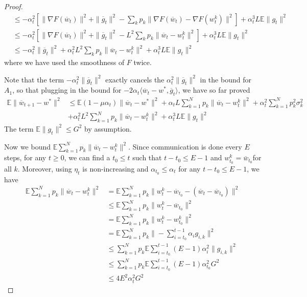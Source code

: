 \begin{proof}
\begin{align*}
 & \leq-\alpha_{t}^{2}\left[\|\nabla F(\overline{w}_{t})\|^{2}+\|\overline{g}_{t}\|^{2}-\sum_{k}p_{k}\|\nabla F(\overline{w}_{t})-\nabla F(w_{t}^{k})\|^{2}\right]+\alpha_{t}^{3}L\mathbb{E}\|g_{t}\|^{2}\\
 & \leq-\alpha_{t}^{2}\left[\|\nabla F(\overline{w}_{t})\|^{2}+\|\overline{g}_{t}\|^{2}-L^{2}\sum_{k}p_{k}\|\overline{w}_{t}-w_{t}^{k}\|^{2}\right]+\alpha_{t}^{3}L\mathbb{E}\|g_{t}\|^{2}\\
 & \leq-\alpha_{t}^{2}\|\overline{g}_{t}\|^{2}+\alpha_{t}^{2}L^{2}\sum_{k}p_{k}\|\overline{w}_{t}-w_{t}^{k}\|^{2}+\alpha_{t}^{3}L\mathbb{E}\|g_{t}\|^{2}
\end{align*}
where we have used the smoothness of $F$ twice. 

Note that the term $-\alpha_{t}^{2}\|\overline{g}_{t}\|^{2}$ exactly
cancels the $\alpha_{t}^{2}\|\overline{g}_{t}\|^{2}$ in the bound
for $A_{1}$, so that plugging in the bound for $-2\alpha_{t}\langle\overline{w}_{t}-w^{\ast},\overline{g}_{t}\rangle$,
we have so far proved 
\begin{align*}
\mathbb{E}\|\overline{w}_{t+1}-w^{\ast}\|^{2} & \leq\mathbb{E}(1-\mu\alpha_{t})\|\overline{w}_{t}-w^{\ast}\|^{2}+\alpha_{t}L\sum_{k=1}^{N}p_{k}\|\overline{w}_{t}-w_{t}^{k}\|^{2}+\alpha_{t}^{2}\sum_{k=1}^{N}p_{k}^{2}\sigma_{k}^{2}\\
 & +\alpha_{t}^{2}L^{2}\sum_{k=1}^{N}p_{k}\|\overline{w}_{t}-w_{t}^{k}\|^{2}+\alpha_{t}^{3}L\mathbb{E}\|g_{t}\|^{2}
\end{align*}
 The term $\mathbb{E}\|g_{t}\|^{2}\leq G^{2}$ by assumption. 

Now we bound $\mathbb{E}\sum_{k=1}^{N}p_{k}\|\overline{w}_{t}-w_{t}^{k}\|^{2}$.
Since communication is done every $E$ steps, for any $t\geq0$, we
can find a $t_{0}\leq t$ such that $t-t_{0}\leq E-1$ and $w_{t_{0}}^{k}=\overline{w}_{t_{0}}$for
all $k$. Moreover, using $\eta_{t}$ is non-increasing and $\alpha_{t_{0}}\leq\alpha{}_{t}$
for any $t-t_{0}\leq E-1$, we have 
\begin{align*}
\mathbb{E}\sum_{k=1}^{N}p_{k}\|\overline{w}_{t}-w_{t}^{k}\|^{2} & =\mathbb{E}\sum_{k=1}^{N}p_{k}\|w_{t}^{k}-\overline{w}_{t_{0}}-(\overline{w}_{t}-\overline{w}_{t_{0}})\|^{2}\\
 & \leq\mathbb{E}\sum_{k=1}^{N}p_{k}\|w_{t}^{k}-\overline{w}_{t_{0}}\|^{2}\\
 & =\mathbb{E}\sum_{k=1}^{N}p_{k}\|w_{t}^{k}-w_{t_{0}}^{k}\|^{2}\\
 & =\mathbb{E}\sum_{k=1}^{N}p_{k}\|-\sum_{i=t_{0}}^{t-1}\alpha_{i}g_{i,k}\|^{2}\\
 & \leq\sum_{k=1}^{N}p_{k}\mathbb{E}\sum_{i=t_{0}}^{t-1}(E-1)\alpha_{i}^{2}\|g_{i,k}\|^{2}\\
 & \leq\sum_{k=1}^{N}p_{k}\mathbb{E}\sum_{i=t_{0}}^{t-1}(E-1)\alpha_{t_{0}}^{2}G^{2}\\
 & \leq4E^{2}\alpha_{t}^{2}G^{2}
\end{align*}


\end{proof}
